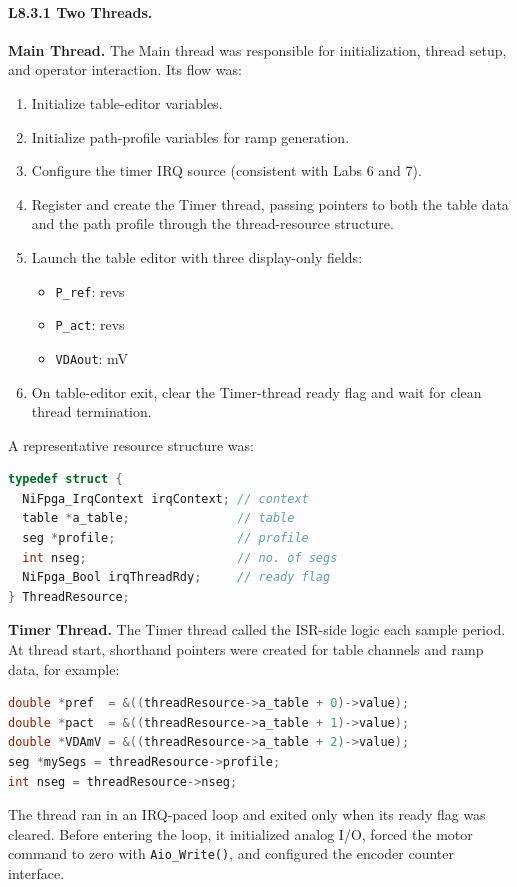 \documentclass[10pt,twocolumn]{article}
\begin{document}
\paragraph{L8.3.1 Two Threads.}
\textbf{Main Thread.} The Main thread was responsible for initialization, thread setup, and operator interaction. Its flow was:
\begin{enumerate}
	\item Initialize table-editor variables.
	\item Initialize path-profile variables for ramp generation.
	\item Configure the timer IRQ source (consistent with Labs 6 and 7).
	\item Register and create the Timer thread, passing pointers to both the table data and the path profile through the thread-resource structure.
	\item Launch the table editor with three display-only fields:
	\begin{itemize}
		\item \texttt{P\_ref}: revs
		\item \texttt{P\_act}: revs
		\item \texttt{VDAout}: mV
	\end{itemize}
	\item On table-editor exit, clear the Timer-thread ready flag and wait for clean thread termination.
\end{enumerate}

A representative resource structure was:
\begin{lstlisting}[language=C]
typedef struct {
  NiFpga_IrqContext irqContext; // context
  table *a_table;               // table
  seg *profile;                 // profile
  int nseg;                     // no. of segs
  NiFpga_Bool irqThreadRdy;     // ready flag
} ThreadResource;
\end{lstlisting}

\textbf{Timer Thread.} The Timer thread called the ISR-side logic each sample period. At thread start, shorthand pointers were created for table channels and ramp data, for example:
\begin{lstlisting}[language=C]
double *pref  = &((threadResource->a_table + 0)->value);
double *pact  = &((threadResource->a_table + 1)->value);
double *VDAmV = &((threadResource->a_table + 2)->value);
seg *mySegs = threadResource->profile;
int nseg = threadResource->nseg;
\end{lstlisting}

The thread ran in an IRQ-paced loop and exited only when its ready flag was cleared. Before entering the loop, it initialized analog I/O, forced the motor command to zero with \texttt{Aio\_Write()}, and configured the encoder counter interface.
\end{document}
